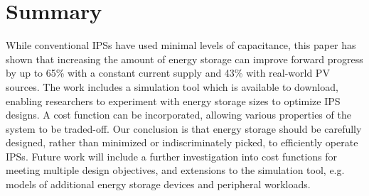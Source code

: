 \section{Summary} \label{sec:c4_summary}

While conventional IPSs have used minimal levels of capacitance, this paper has shown that increasing the amount of energy storage can improve forward progress by up to 65\% with a constant current supply and 43\% with real-world PV sources. The work includes a simulation tool which is available to download, enabling researchers to experiment with energy storage sizes to optimize IPS designs. A cost function can be incorporated, allowing various properties of the system to be traded-off. Our conclusion is that energy storage should be carefully designed, rather than minimized or indiscriminately picked, to efficiently operate IPSs. Future work will include a further investigation into cost functions for meeting multiple design objectives, and extensions to the simulation tool, e.g. models of additional energy storage devices and peripheral workloads.